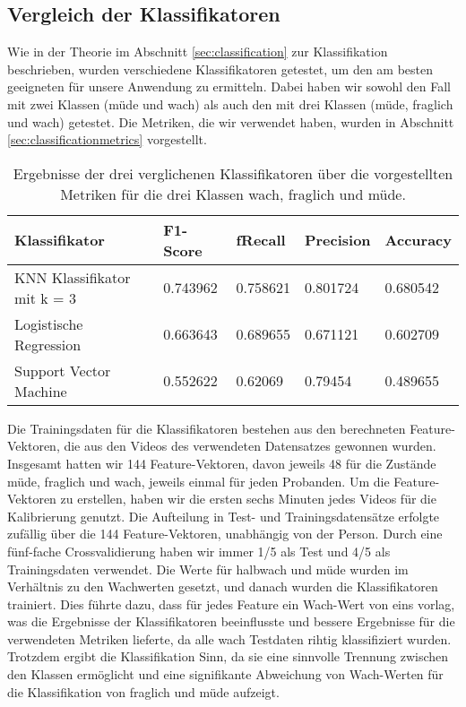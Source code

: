 \subsection{Vergleich der Klassifikatoren}
\label{subsec:classificatorcomparison}
Wie in der Theorie im Abschnitt \ref{sec:classification} zur Klassifikation beschrieben, wurden verschiedene Klassifikatoren getestet, um den am besten geeigneten für unsere Anwendung zu ermitteln. Dabei haben wir sowohl den Fall mit zwei Klassen (müde und wach) als auch den mit drei Klassen (müde, fraglich und wach) getestet. Die Metriken, die wir verwendet haben, wurden in Abschnitt \ref{sec:classificationmetrics} vorgestellt.

\begin{table}
    \centering
    \begin{tabular}{|l|l|l|l|l|}
    \hline
        {Klassifikator} & {F1-Score} & f{Recall} & {Precision} & {Accuracy} \\ \hline
        {KNN Klassifikator mit k = 3} & 0.743962 & 0.758621 & 0.801724 & 0.680542 \\ \hline
        {Logistische Regression} & 0.663643 & 0.689655 & 0.671121 & 0.602709 \\ \hline
        {Support Vector Machine} & 0.552622 & 0.62069 & 0.79454 & 0.489655 \\ \hline
    \end{tabular}
\caption{Ergebnisse der drei verglichenen Klassifikatoren über die vorgestellten Metriken für die drei Klassen wach, fraglich und müde.}
\label{table:threeclassificator}
\end{table}

Die Trainingsdaten für die Klassifikatoren bestehen aus den berechneten Feature-Vektoren, die aus den Videos des verwendeten Datensatzes gewonnen wurden. Insgesamt hatten wir 144 Feature-Vektoren, davon jeweils 48 für die Zustände müde, fraglich und wach, jeweils einmal für jeden Probanden. Um die Feature-Vektoren zu erstellen, haben wir die ersten sechs Minuten jedes Videos für die Kalibrierung genutzt. Die Aufteilung in Test- und Trainingsdatensätze erfolgte zufällig über die 144 Feature-Vektoren, unabhängig von der Person. Durch eine fünf-fache Crossvalidierung haben wir immer 1/5 als Test und 4/5 als Trainingsdaten verwendet. Die Werte für halbwach und müde wurden im Verhältnis zu den Wachwerten gesetzt, und danach wurden die Klassifikatoren trainiert. Dies führte dazu, dass für jedes Feature ein Wach-Wert von eins vorlag, was die Ergebnisse der Klassifikatoren beeinflusste und bessere Ergebnisse für die verwendeten Metriken lieferte, da alle wach Testdaten rihtig klassifiziert wurden. Trotzdem ergibt die Klassifikation Sinn, da sie eine sinnvolle Trennung zwischen den Klassen ermöglicht und eine signifikante Abweichung von Wach-Werten für die Klassifikation von fraglich und müde aufzeigt.

